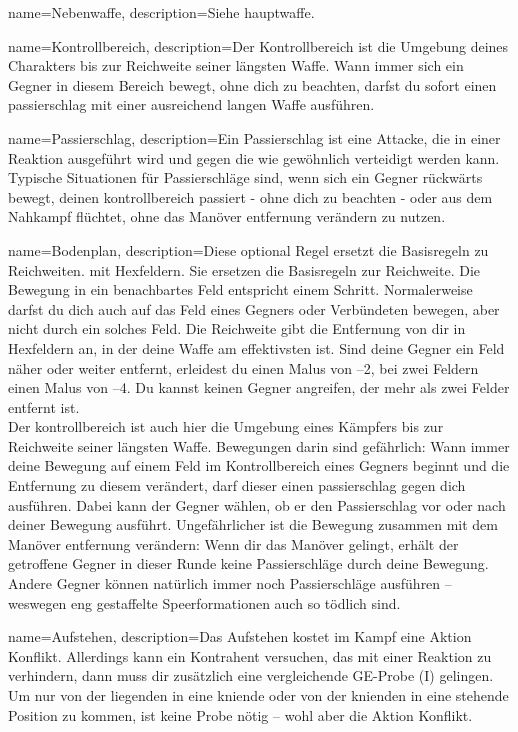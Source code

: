 {
    name={Nebenwaffe},
    description={Siehe \gls{hauptwaffe}.}

{
    name={Kontrollbereich},
    description={Der Kontrollbereich ist die Umgebung deines Charakters bis zur Reichweite seiner längsten Waffe. Wann immer sich ein Gegner in diesem Bereich bewegt, ohne dich zu beachten, darfst du sofort einen \gls{passierschlag} mit einer ausreichend langen Waffe ausführen.}}

{
    name={Passierschlag},
    description={Ein Passierschlag ist eine Attacke, die in einer Reaktion ausgeführt wird und gegen die wie gewöhnlich verteidigt werden kann. Typische Situationen für Passierschläge sind, wenn sich ein Gegner rückwärts bewegt, deinen \gls{kontrollbereich} passiert - ohne dich zu beachten - oder aus dem Nahkampf flüchtet, ohne das Manöver \gls{entfernung verändern} zu nutzen.}}

{
    name={Bodenplan},
    description={Diese optional Regel ersetzt die Basisregeln zu Reichweiten. mit Hexfeldern. Sie ersetzen die Basisregeln zur Reichweite.
Die Bewegung in ein benachbartes Feld entspricht einem Schritt. Normalerweise darfst du dich auch auf das Feld eines Gegners oder Verbündeten bewegen, aber nicht durch ein solches Feld. Die Reichweite gibt die Entfernung von dir in Hexfeldern an, in der deine Waffe am effektivsten ist. Sind deine Gegner ein Feld näher oder weiter entfernt, erleidest du einen Malus von –2, bei zwei Feldern einen Malus von –4. Du kannst keinen Gegner angreifen, der mehr als zwei Felder entfernt ist.\\
Der \gls{kontrollbereich} ist auch hier die Umgebung eines Kämpfers bis zur Reichweite seiner längsten Waffe. Bewegungen darin sind gefährlich: Wann immer deine Bewegung auf einem Feld im Kontroll­bereich eines Gegners beginnt und die Entfernung zu diesem verändert, darf dieser einen \gls{passierschlag} gegen dich ausführen. Dabei kann der Gegner wählen, ob er den Passier­schlag vor oder nach deiner Bewegung ausführt. Ungefährlicher ist die Bewegung zusammen mit dem Manöver \gls{entfernung verändern}: Wenn dir das Manöver gelingt, erhält der getroffene Gegner in dieser Runde keine Passierschläge durch deine Bewegung. Andere Gegner können natürlich immer noch Passierschläge ausführen – weswegen eng gestaffelte Speerformationen auch so tödlich sind.}}

{
    name={Aufstehen},
    description={Das Aufstehen kostet im Kampf eine Aktion Konflikt. Allerdings kann ein Kontrahent versuchen, das mit einer Reaktion zu verhindern, dann muss dir zusätzlich eine vergleichende GE-Probe (I) gelingen. Um nur von der liegenden in eine kniende oder von der knienden in eine stehende Position zu kommen, ist keine Probe nötig – wohl aber die Aktion Konflikt.}}
    

}
